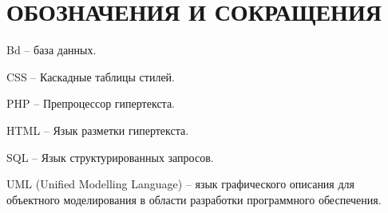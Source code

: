 \newsection
\section*{ОБОЗНАЧЕНИЯ И СОКРАЩЕНИЯ}

Bd -- база данных.

CSS -- Каскадные таблицы стилей.

PHP -- Препроцессор гипертекста. 

HTML -- Язык разметки гипертекста.

SQL -- Язык структурированных запросов. 

UML (Unified Modelling Language) -- язык графического описания для объектного моделирования в области разработки программного обеспечения.
